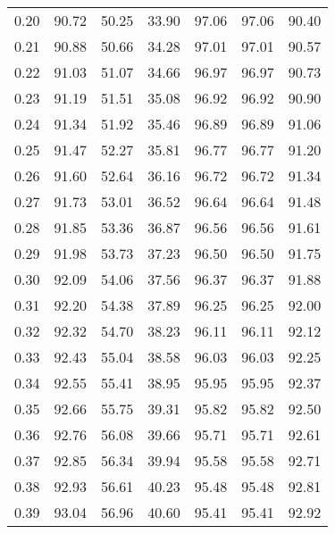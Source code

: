 \begin{tabular}{|c|c|c|c|c|c|c|}
      0.20 &     90.72 &     50.25 &      33.90 &   97.06 &      97.06 &         90.40 \\
      0.21 &     90.88 &     50.66 &      34.28 &   97.01 &      97.01 &         90.57 \\
      0.22 &     91.03 &     51.07 &      34.66 &   96.97 &      96.97 &         90.73 \\
      0.23 &     91.19 &     51.51 &      35.08 &   96.92 &      96.92 &         90.90 \\
      0.24 &     91.34 &     51.92 &      35.46 &   96.89 &      96.89 &         91.06 \\
      0.25 &     91.47 &     52.27 &      35.81 &   96.77 &      96.77 &         91.20 \\
      0.26 &     91.60 &     52.64 &      36.16 &   96.72 &      96.72 &         91.34 \\
      0.27 &     91.73 &     53.01 &      36.52 &   96.64 &      96.64 &         91.48 \\
      0.28 &     91.85 &     53.36 &      36.87 &   96.56 &      96.56 &         91.61 \\
      0.29 &     91.98 &     53.73 &      37.23 &   96.50 &      96.50 &         91.75 \\
      0.30 &     92.09 &     54.06 &      37.56 &   96.37 &      96.37 &         91.88 \\
      0.31 &     92.20 &     54.38 &      37.89 &   96.25 &      96.25 &         92.00 \\
      0.32 &     92.32 &     54.70 &      38.23 &   96.11 &      96.11 &         92.12 \\
      0.33 &     92.43 &     55.04 &      38.58 &   96.03 &      96.03 &         92.25 \\
      0.34 &     92.55 &     55.41 &      38.95 &   95.95 &      95.95 &         92.37 \\
      0.35 &     92.66 &     55.75 &      39.31 &   95.82 &      95.82 &         92.50 \\
      0.36 &     92.76 &     56.08 &      39.66 &   95.71 &      95.71 &         92.61 \\
      0.37 &     92.85 &     56.34 &      39.94 &   95.58 &      95.58 &         92.71 \\
      0.38 &     92.93 &     56.61 &      40.23 &   95.48 &      95.48 &         92.81 \\
      0.39 &     93.04 &     56.96 &      40.60 &   95.41 &      95.41 &         92.92 \\

\end{tabular}
